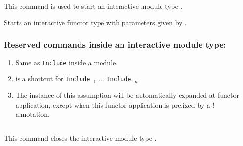 \subsection{}

This command is used to start an interactive module type {\ident}.

\begin{Variants}

\item{}

  Starts an interactive functor type with parameters given by {\modbindings}.

\end{Variants}
\subsubsection{Reserved commands inside an interactive module type:
}
\label{Inline}
\begin{enumerate}
\item {}

 Same as {\tt Include} inside a module.

\item {}

is a shortcut for {\tt Include {\module$_1$}}  $\ldots$ {\tt Include {\module$_n$}}

\item {}

 The instance of this assumption will be automatically expanded at functor
 application, except when this functor application is prefixed by a $!$ annotation.
\end{enumerate}
\subsection{}

This command closes the interactive module type {\ident}.

\begin{ErrMsgs}
\item {}
\end{ErrMsgs}

\subsection{}

